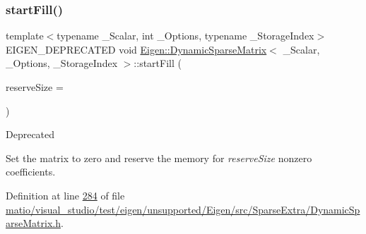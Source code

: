 \mbox{\label{class_eigen_1_1_dynamic_sparse_matrix_abade0bf46139d8577aa24ead30c76771}} 
\subsubsection{\texorpdfstring{start\+Fill()}{startFill()}\hspace{0.1cm}{\footnotesize\ttfamily [2/2]}}
{\footnotesize\ttfamily template$<$typename \+\_\+\+Scalar, int \+\_\+\+Options, typename \+\_\+\+Storage\+Index$>$ \\
E\+I\+G\+E\+N\+\_\+\+D\+E\+P\+R\+E\+C\+A\+T\+ED void \hyperlink{class_eigen_1_1_dynamic_sparse_matrix}{Eigen\+::\+Dynamic\+Sparse\+Matrix}$<$ \+\_\+\+Scalar, \+\_\+\+Options, \+\_\+\+Storage\+Index $>$\+::start\+Fill (\begin{DoxyParamCaption}\item[{\hyperlink{group___core___module_a554f30542cc2316add4b1ea0a492ff02}{Index}}]{reserve\+Size = {} }\end{DoxyParamCaption})\hspace{0.3cm}{\ttfamily [inline]}}

\begin{DoxyRefDesc}{Deprecated}
\item[\hyperlink{deprecated__deprecated000085}{Deprecated}]Set the matrix to zero and reserve the memory for {\itshape reserve\+Size} nonzero coefficients. \end{DoxyRefDesc}


Definition at line \hyperlink{matio_2visual__studio_2test_2eigen_2unsupported_2_eigen_2src_2_sparse_extra_2_dynamic_sparse_matrix_8h_source_l00284}{284} of file \hyperlink{matio_2visual__studio_2test_2eigen_2unsupported_2_eigen_2src_2_sparse_extra_2_dynamic_sparse_matrix_8h_source}{matio/visual\+\_\+studio/test/eigen/unsupported/\+Eigen/src/\+Sparse\+Extra/\+Dynamic\+Sparse\+Matrix.\+h}.

\mbox{\label{class_eigen_1_1_dynamic_sparse_matrix_a294b998a50cc01859425e5e7c23d6108}} 
